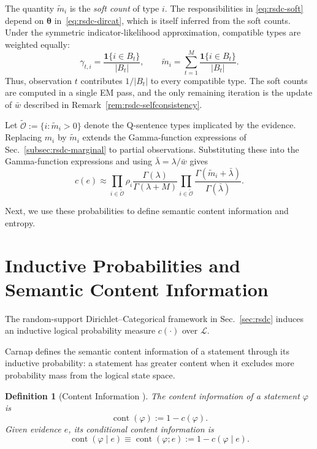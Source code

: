 \documentclass[10pt, conference, letterpaper]{ IEEEtran}
\theoremstyle{bfnote}
\newtheorem{definition}{Definition}
\newcommand{\Language}{\mathcal{L}} %
\begin{document}
The quantity $\widetilde m_i$ is the \emph{soft count} of type $i$. The responsibilities in \eqref{eq:rsdc-soft} depend on
$\boldsymbol{\theta}$ in~\eqref{eq:rsdc-dircat}, which is itself inferred from the soft counts. Under
the symmetric indicator-likelihood approximation, compatible types are
weighted equally:
\begin{equation}
\label{eq:rsdc-equalsplit}
\gamma_{t,i}
=
\frac{\mathbf{1}\{i\in B_t\}}{|B_t|},
\qquad
\widetilde m_i
=
\sum_{t=1}^{M}
\frac{\mathbf{1}\{i\in B_t\}}{|B_t|}.
\end{equation}
Thus, observation $t$ contributes $1/|B_t|$ to every compatible type. The
soft counts are computed in a single EM pass, and the only remaining iteration
is the update of $\bar w$ described in
Remark~\ref{rem:rsdc-selfconsistency}.

Let $\widetilde{\mathcal{O}}:=\{i:\widetilde m_i>0\}$ denote the Q-sentence types implicated by the evidence. Replacing $m_i$ by $\widetilde m_i$ extends the Gamma-function expressions
of Sec.~\ref{subsec:rsdc-marginal} to partial observations. Substituting these into the Gamma-function expressions and using
$\bar{\lambda}=\lambda/\bar w$ gives
\begin{equation}
\label{eq:rsdc-softmarg}
c(e)
\approx
\prod_{i\in\widetilde{\mathcal{O}}}\rho_i
\frac{\Gamma(\lambda)}
     {\Gamma(\lambda+M)}
\prod_{i\in\widetilde{\mathcal{O}}}
\frac{\Gamma(\widetilde m_i+\bar{\lambda})}
     {\Gamma(\bar{\lambda})}.
\end{equation}

Next, we use these probabilities to define semantic content information and entropy.

\section{Inductive Probabilities and Semantic Content Information}
\label{sec:inductive-semantic-information}


The random-support Dirichlet--Categorical framework in
Sec.~\ref{sec:rsdc} induces an inductive logical probability measure
$c(\cdot)$ over $\Language$.

Carnap defines the semantic content information of a statement through its inductive
probability: a statement has greater content when it excludes more
probability mass from the logical state space.

\begin{definition}[Content Information {\cite{c2}}]
\label{cont-info}
The \emph{content information} of a statement $\varphi$ is
\begin{equation}
\label{eq:absolute-content}
\operatorname{cont}(\varphi)
:=
1-c(\varphi).
\end{equation}
Given evidence $e$, its conditional content information is
\begin{equation}
\label{eq:conditional-content}
\operatorname{cont}(\varphi\mid e)
\equiv
\operatorname{cont}(\varphi;e)
:=
1-c(\varphi\mid e).
\end{equation}
\end{definition}
\end{document}
